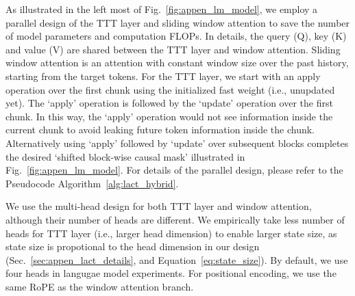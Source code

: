 As illustrated in the left most of Fig.~\ref{fig:appen_lm_model}, we employ a parallel design of the TTT layer and sliding window attention to save the number of model parameters and computation FLOPs.
In details, the query (Q), key (K) and value (V) are shared between the TTT layer and window attention.
Sliding window attention is an attention with constant window size over the past history, starting from the target tokens.
For the TTT layer, we start with an apply operation over the first chunk using the initialized fast weight (i.e., unupdated yet).
The `apply' operation is followed by the `update' operation over the first chunk.
In this way, the `apply' operation would not see information inside the current chunk to avoid leaking future token information inside the chunk.
Alternatively using `apply' followed by `update' over subsequent blocks completes the desired `shifted block-wise causal mask' illustrated in Fig.~\ref{fig:appen_lm_model}.
For details of the parallel design, please refer to the Pseudocode Algorithm~\ref{alg:lact_hybrid}.



We use the multi-head design for both TTT layer and window attention, although their number of heads are different.
We empirically take less number of heads for TTT layer (i.e., larger head dimension) to enable larger state size, as state size is propotional to the head dimension in our design (Sec.~\ref{sec:appen_lact_details}, and Equation~\ref{eq:state_size}). By default, we use four heads in langugae model experiments.  For positional encoding, we use the same RoPE as the window attention branch. 


